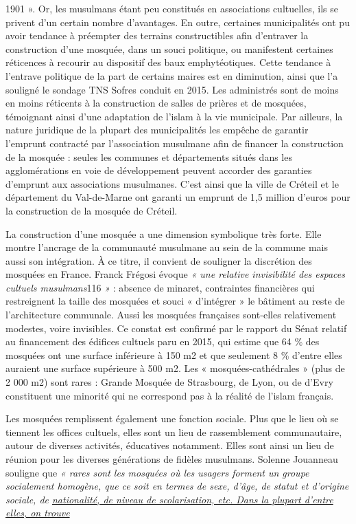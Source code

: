 1901 ». Or, les musulmans étant peu constitués en associations
cultuelles, ils se privent d'un certain nombre d'avantages. En outre,
certaines municipalités ont pu avoir tendance à préempter des terrains
constructibles afin d'entraver la construction d'une mosquée, dans un
souci politique, ou manifestent certaines réticences à recourir au
dispositif des baux emphytéotiques. Cette tendance à l'entrave politique
de la part de certains maires est en diminution, ainsi que l'a souligné
le sondage TNS Sofres conduit en 2015. Les administrés sont de moins en
moins réticents à la construction de salles de prières et de mosquées,
témoignant ainsi d'une adaptation de l'islam à la vie municipale. Par
ailleurs, la nature juridique de la plupart des municipalités les
empêche de garantir l'emprunt contracté par l'association musulmane afin
de financer la construction de la mosquée : seules les communes et
départements situés dans les agglomérations en voie de développement
peuvent accorder des garanties d'emprunt aux associations musulmanes.
C'est ainsi que la ville de Créteil et le département du Val-de-Marne
ont garanti un emprunt de 1,5 million d'euros pour la construction de la
mosquée de Créteil.

La construction d'une mosquée a une dimension symbolique très forte.
Elle montre l'ancrage de la communauté musulmane au sein de la commune
mais aussi son intégration. À ce titre, il convient de souligner la
discrétion des mosquées en France. Franck Frégosi évoque \emph{« une
relative invisibilité des espaces cultuels musulmans}116 \emph{»} :
absence de minaret, contraintes financières qui restreignent la taille
des mosquées et souci « d'intégrer » le bâtiment au reste de
l'architecture communale. Aussi les mosquées françaises sont-elles
relativement modestes, voire invisibles. Ce constat est confirmé par le
rapport du Sénat relatif au financement des édifices cultuels paru en
2015, qui estime que 64 \% des mosquées ont une surface inférieure à 150
m2 et que seulement 8 \% d'entre elles auraient une surface supérieure à
500 m2. Les « mosquées-cathédrales » (plus de 2 000 m2) sont rares :
Grande Mosquée de Strasbourg, de Lyon, ou de d'Evry constituent une
minorité qui ne correspond pas à la réalité de l'islam français.

Les mosquées remplissent également une fonction sociale. Plus que le
lieu où se tiennent les offices cultuels, elles sont un lieu de
rassemblement communautaire, autour de diverses activités, éducatives
notamment. Elles sont ainsi un lieu de réunion pour les diverses
générations de fidèles musulmans. Solenne Jouanneau souligne que \emph{«
rares sont les mosquées où les usagers forment un groupe socialement
homogène, que ce soit en termes de sexe, d'âge, de statut et d'origine
sociale, de \underline{nationalité, de niveau de scolarisation, etc.
Dans la plupart d'entre elles, on trouve}}

